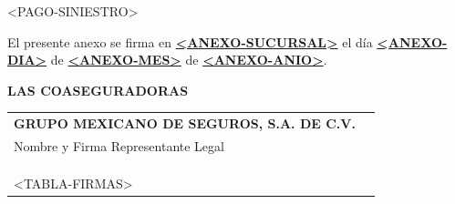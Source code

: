 \documentclass[letterpaper,10pt]{article}
\begin{document}
<PAGO-SINIESTRO>

\newpage

El presente anexo se firma en \underline{\textbf{<ANEXO-SUCURSAL>}} el día \underline{\textbf{<ANEXO-DIA>}} de \underline{\textbf{<ANEXO-MES>}} de \underline{\textbf{<ANEXO-ANIO>}}.\\

\begin{center}
    \textbf{LAS COASEGURADORAS}\\\vspace{1cm}
    
    \begin{tabularx}{\textwidth}{Xr}
        \textbf{GRUPO MEXICANO DE SEGUROS, S.A. DE C.V.} &\\
        Nombre y Firma Representante Legal & \underline{\hspace{5cm}}\\\\\\\\
        <TABLA-FIRMAS>
    \end{tabularx}
\end{center}
	
\end{document}
